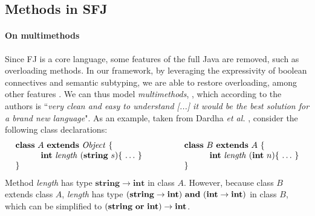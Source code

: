 \documentclass[runningheads]{llncs}
\begin{document}


\subsection{Methods in SFJ}
\label{sec:methods}
\paragraph{On multimethods}
Since FJ is a core language, some features of the full Java are removed, such as overloading methods.
In our framework, by leveraging the expressivity of boolean connectives and semantic subtyping, we are able to restore overloading, among other features \cite[\S 8.4]{Dardha2017}.
We can thus model \emph{multimethods}, \cite{BC97}, which according to the authors is ``\emph{very clean and easy to understand [...] it would be the best solution for a brand new language}".
As an example, taken from Dardha \emph{et al.}  \cite{Dardha2013,Dardha2017}, consider the following class declarations:
$$
\begin{array}{ll}
\mathbf{class} \  A \ \mathbf{extends }\  \mathit{Object}\ \{
&
\qquad
\mathbf{class} \  B \ \mathbf{extends }\  A\ \{
\\
	\qquad\quad \mathbf{int}\ \mathit{length}\ (\mathbf{string}\ s)\{\ \ldots\ \}\qquad
&
	\qquad\qquad\quad \mathbf{int}\ \mathit{length}\ (\mathbf{int}\ n)\{\ \ldots\ \}
\\
\}
&
\qquad \}
\end{array}
$$
Method {\it length} has type $\mathbf{string} \rightarrow \mathbf{int}$ in class $A$.
However, because class $B$ extends class $A$,  {\it length} has type $(\mathbf{string} \rightarrow \mathbf{int})\ \mathbf{and}\ (\mathbf{int} \rightarrow \mathbf{int})$ in class $B$,
which can be simplified to $(\mathbf{string}\ \mathbf{or}\ \mathbf{int}) \rightarrow \mathbf{int}$.
\end{document}
